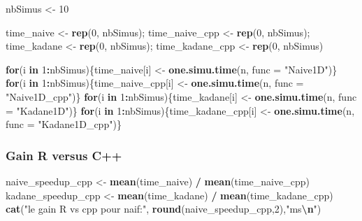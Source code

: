 \documentclass[
]{article}
\newenvironment{Shaded}{\begin{snugshade}}{\end{snugshade}}
\newcommand{\AttributeTok}[1]{\textcolor[rgb]{0.13,0.29,0.53}{#1}}
\newcommand{\ControlFlowTok}[1]{\textcolor[rgb]{0.13,0.29,0.53}{\textbf{#1}}}
\newcommand{\DecValTok}[1]{\textcolor[rgb]{0.00,0.00,0.81}{#1}}
\newcommand{\FunctionTok}[1]{\textcolor[rgb]{0.13,0.29,0.53}{\textbf{#1}}}
\newcommand{\NormalTok}[1]{#1}
\newcommand{\OtherTok}[1]{\textcolor[rgb]{0.56,0.35,0.01}{#1}}
\newcommand{\SpecialCharTok}[1]{\textcolor[rgb]{0.81,0.36,0.00}{\textbf{#1}}}
\newcommand{\StringTok}[1]{\textcolor[rgb]{0.31,0.60,0.02}{#1}}
\begin{document}
\begin{Shaded}
\begin{Highlighting}[]
\NormalTok{nbSimus }\OtherTok{\textless{}{-}} \DecValTok{10}

\NormalTok{time\_naive }\OtherTok{\textless{}{-}} \FunctionTok{rep}\NormalTok{(}\DecValTok{0}\NormalTok{, nbSimus); time\_naive\_cpp }\OtherTok{\textless{}{-}} \FunctionTok{rep}\NormalTok{(}\DecValTok{0}\NormalTok{, nbSimus);}
\NormalTok{time\_kadane }\OtherTok{\textless{}{-}} \FunctionTok{rep}\NormalTok{(}\DecValTok{0}\NormalTok{, nbSimus); time\_kadane\_cpp }\OtherTok{\textless{}{-}} \FunctionTok{rep}\NormalTok{(}\DecValTok{0}\NormalTok{, nbSimus)}

\ControlFlowTok{for}\NormalTok{(i }\ControlFlowTok{in} \DecValTok{1}\SpecialCharTok{:}\NormalTok{nbSimus)\{time\_naive[i] }\OtherTok{\textless{}{-}} \FunctionTok{one.simu.time}\NormalTok{(n, }\AttributeTok{func =} \StringTok{"Naive1D"}\NormalTok{)\}}
\ControlFlowTok{for}\NormalTok{(i }\ControlFlowTok{in} \DecValTok{1}\SpecialCharTok{:}\NormalTok{nbSimus)\{time\_naive\_cpp[i] }\OtherTok{\textless{}{-}} \FunctionTok{one.simu.time}\NormalTok{(n, }\AttributeTok{func =} \StringTok{"Naive1D\_cpp"}\NormalTok{)\}}
\ControlFlowTok{for}\NormalTok{(i }\ControlFlowTok{in} \DecValTok{1}\SpecialCharTok{:}\NormalTok{nbSimus)\{time\_kadane[i] }\OtherTok{\textless{}{-}} \FunctionTok{one.simu.time}\NormalTok{(n, }\AttributeTok{func =} \StringTok{"Kadane1D"}\NormalTok{)\}}
\ControlFlowTok{for}\NormalTok{(i }\ControlFlowTok{in} \DecValTok{1}\SpecialCharTok{:}\NormalTok{nbSimus)\{time\_kadane\_cpp[i] }\OtherTok{\textless{}{-}} \FunctionTok{one.simu.time}\NormalTok{(n, }\AttributeTok{func =} \StringTok{"Kadane1D\_cpp"}\NormalTok{)\}}
\end{Highlighting}
\end{Shaded}

\subsubsection{Gain R versus C++}\label{gain-r-versus-c}

\begin{Shaded}
\begin{Highlighting}[]
\NormalTok{naive\_speedup\_cpp }\OtherTok{\textless{}{-}} \FunctionTok{mean}\NormalTok{(time\_naive) }\SpecialCharTok{/} \FunctionTok{mean}\NormalTok{(time\_naive\_cpp)}
\NormalTok{kadane\_speedup\_cpp }\OtherTok{\textless{}{-}} \FunctionTok{mean}\NormalTok{(time\_kadane) }\SpecialCharTok{/} \FunctionTok{mean}\NormalTok{(time\_kadane\_cpp)}
\FunctionTok{cat}\NormalTok{(}\StringTok{"le gain R vs cpp pour naif:"}\NormalTok{, }\FunctionTok{round}\NormalTok{(naive\_speedup\_cpp,}\DecValTok{2}\NormalTok{),}\StringTok{"ms}\SpecialCharTok{\textbackslash{}n}\StringTok{"}\NormalTok{)}
\end{Highlighting}
\end{Shaded}
\end{document}
